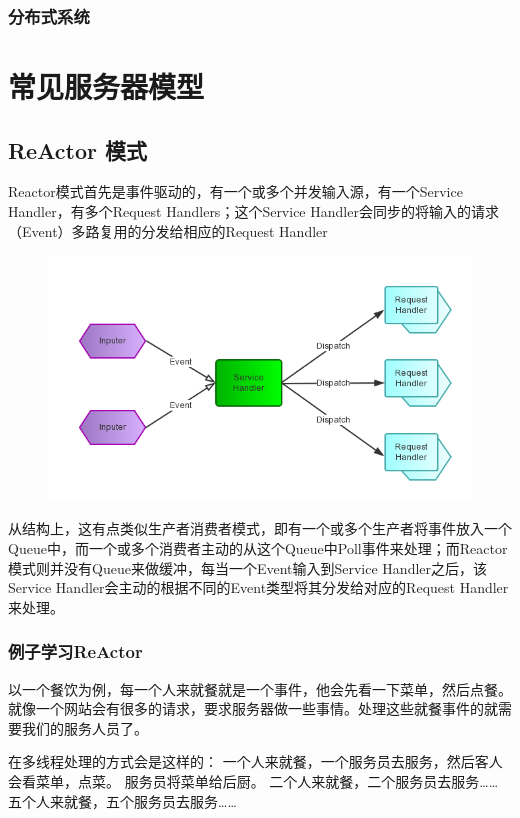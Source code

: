 \documentclass[UTF8,a4paper,8pt]{ctexbook}
\begin{document}
		\subsection{分布式系统}
	
	
\chapter{常见服务器模型}
	\section{ReActor 模式}
		Reactor模式首先是事件驱动的，有一个或多个并发输入源，有一个Service Handler，有多个Request Handlers；这个Service Handler会同步的将输入的请求（Event）多路复用的分发给相应的Request Handler 
	
			\begin{figure}[h]
				\centering
				\includegraphics[scale = 0.7]{Reactor.png}
			\end{figure}
	
		从结构上，这有点类似生产者消费者模式，即有一个或多个生产者将事件放入一个Queue中，而一个或多个消费者主动的从这个Queue中Poll事件来处理；而Reactor模式则并没有Queue来做缓冲，每当一个Event输入到Service Handler之后，该Service Handler会主动的根据不同的Event类型将其分发给对应的Request Handler来处理。
		
		\subsection{例子学习ReActor}
			以一个餐饮为例，每一个人来就餐就是一个事件，他会先看一下菜单，然后点餐。就像一个网站会有很多的请求，要求服务器做一些事情。处理这些就餐事件的就需要我们的服务人员了。
			
			在多线程处理的方式会是这样的：
			一个人来就餐，一个服务员去服务，然后客人会看菜单，点菜。 服务员将菜单给后厨。
			二个人来就餐，二个服务员去服务……
			五个人来就餐，五个服务员去服务……
			
\end{document}

